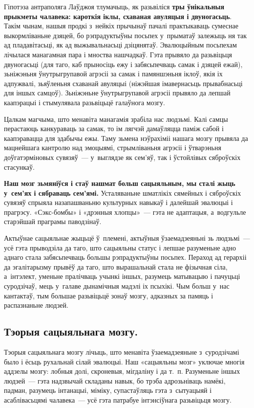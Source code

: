 Гіпотэза антраполяга Лаўджоя тлумачыць, як разьвіліся \textbf{тры ўнікальныя прыкметы чалавека: кароткія іклы, схаваная авуляцыя і двуногасьць}. Такім чынам, нашыя продкі з~нейкіх прычынаў пачалі практыкаваць сумеснае выкормліваньне дзяцей, бо рэпрадуктыўны посьпех у~прыматаў залежыць ня так ад пладавітасьці, як ад выжывальнасьці дзіцянятаў. Эвалюцыйным посьпехам лічылася манагамная пара і мноства нашчадкаў. Гэта прывяло да разьвіцьця двуногасьці (для таго, каб прыносіць ежу і забясьпечваць самак і дзяцей ежай), зьніжэньня ўнутрыгрупавой агрэсіі за самак і памяншэньня іклоў, якія іх адпужвалі, зьяўленьня схаванай авуляцыі (ніжэйшая імавернасьць прывабнасьці для іншых самцоў). Зьніжэньне ўнутрыгрупавой агрэсіі прывяло да лепшай каапэрацыі і стымулявала разьвіцьцё галаўнога мозгу.

Цалкам магчыма, што менавіта манагамія зрабіла нас людзьмі. Калі самцы перастаюць канкураваць за самак, то ім лягчэй дамаўляцца паміж сабой і каапэравацца для здабычы ежы. Таму зьмена нэўрахіміі нашага мозгу прывяла да мацнейшага кантролю над эмоцыямі, стрымліваньня агрэсіі і ўтварэньня доўгатэрміновых сувязяў~--- у~выглядзе як сем'яў, так і ўстойлівых сяброўскіх стасункаў.

\textbf{Наш мозг зьмяніўся і стаў нашмат больш сацыяльным, мы сталі жыць у~сем'ях і сябраваць сем'ямі.} Усталяваньне шматлікіх сямейных і сяброўскіх сувязяў спрыяла назапашваньню культурных навыкаў і далейшай эвалюцыі і прагрэсу. «Сэкс-бомбы» і «дрэнныя хлопцы»~--- гэта не адаптацыя, а~водгульле старэйшай праграмы паводзінаў.

Актыўнае сацыяльнае жыцьцё ў~племені, актыўныя ўзаемадзеяньні зь людзьмі~--- усё гэта прыводзіла да таго, што сацыяльны статус і лепшае разуменьне адно аднаго стала забясьпечваць большы рэпрадуктыўны посьпех. Пераход ад герархіі да эгалітарызму прывёў да таго, што вырашальнай стала не фізычная сіла, а~інтэлект, уменьне пралічваць учынкі іншых, разумець матывацыю і пачуцьці суродзічаў, мець у~галаве дынамічныя мадэлі іх псыхікі. Чым больш у~нас кантактаў, тым большае разьвіцьцё зонаў мозгу, адказных за памяць і распазнаньне людзей.

\subsection*{Тэорыя сацыяльнага мозгу.}

Тэорыя сацыяльнага мозгу лічыць, што менавіта ўзаемадзеяньне з~суродзічамі было і ёсьць рухальнай сілай эвалюцыі. Наш «сацыяльны мозг» уключае многія аддзелы мозгу: лобныя долі, скроневыя, мігдаліну і да т.~п. Разуменьне іншых людзей~--- гэта надзвычай складаны навык, бо трэба адрозьніваць намёкі, падман, разумець інтанацыі, міміку, супастаўляць гэта з~сытуацыяй і асаблівасьцямі чалавека~--- усё гэта патрабуе інтэнсіўнага разьвіцьця мозгу.


